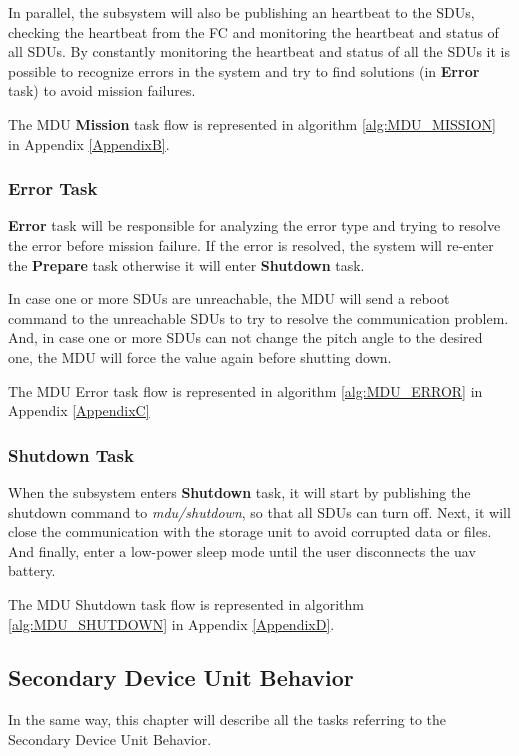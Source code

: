 In parallel, the subsystem will also be publishing an heartbeat to the SDUs, checking the heartbeat from the FC and monitoring the heartbeat and status of all SDUs.
By constantly monitoring the heartbeat and status of all the SDUs it is possible to recognize errors in the system and try to find solutions (in \textbf{Error} task) to avoid mission failures.

The MDU \textbf{Mission} task flow is represented in algorithm \ref{alg:MDU_MISSION} in Appendix \ref{AppendixB}.

\subsubsection{Error Task}
\textbf{Error} task will be responsible for analyzing the error type and trying to resolve the error before mission failure.
If the error is resolved, the system will re-enter the \textbf{Prepare} task otherwise it will enter \textbf{Shutdown} task.

In case one or more SDUs are unreachable, the MDU will send a reboot command to the unreachable SDUs to try to resolve the communication problem.
And, in case one or more SDUs can not change the pitch angle to the desired one, the MDU will force the value again before shutting down.

The MDU Error task flow is represented in algorithm \ref{alg:MDU_ERROR} in Appendix \ref{AppendixC}\\

\subsubsection{Shutdown Task}
When the subsystem enters \textbf{Shutdown} task, it will start by publishing the shutdown command to \textit{mdu\slash shutdown}, so that all SDUs can turn off.
Next, it will close the communication with the storage unit to avoid corrupted data or files.
And finally, enter a low-power sleep mode until the user disconnects the \gls{uav} battery.

The MDU Shutdown task flow is represented in algorithm \ref{alg:MDU_SHUTDOWN} in Appendix \ref{AppendixD}.

\subsection{Secondary Device Unit Behavior}
In the same way, this chapter will describe all the tasks referring to the Secondary Device Unit Behavior.

